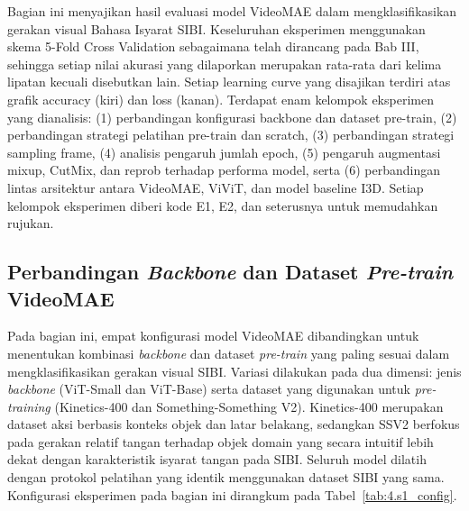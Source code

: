 Bagian ini menyajikan hasil evaluasi model VideoMAE dalam mengklasifikasikan gerakan visual Bahasa Isyarat SIBI. Keseluruhan eksperimen menggunakan skema 5-Fold Cross Validation sebagaimana telah dirancang pada Bab III, sehingga setiap nilai akurasi yang dilaporkan merupakan rata-rata dari kelima lipatan kecuali disebutkan lain. Setiap learning curve yang disajikan terdiri atas grafik accuracy (kiri) dan loss (kanan). Terdapat enam kelompok eksperimen yang dianalisis: (1) perbandingan konfigurasi backbone dan dataset pre-train, (2) perbandingan strategi pelatihan pre-train dan scratch, (3) perbandingan strategi sampling frame, (4) analisis pengaruh jumlah epoch, (5) pengaruh augmentasi mixup, CutMix, dan reprob terhadap performa model, serta (6) perbandingan lintas arsitektur antara VideoMAE, ViViT, dan model baseline I3D. Setiap kelompok eksperimen diberi kode E1, E2, dan seterusnya untuk memudahkan rujukan.
\subsection{Perbandingan \textit{Backbone} dan Dataset \textit{Pre-train} VideoMAE} \label{IV.Sek1}

Pada bagian ini, empat konfigurasi model VideoMAE dibandingkan untuk menentukan kombinasi \textit{backbone} dan dataset \textit{pre-train} yang paling sesuai dalam mengklasifikasikan gerakan visual SIBI. Variasi dilakukan pada dua dimensi: jenis \textit{backbone} (ViT-Small dan ViT-Base) serta dataset yang digunakan untuk \textit{pre-training} (Kinetics-400 dan Something-Something V2). Kinetics-400 merupakan dataset aksi berbasis konteks objek dan latar belakang, sedangkan SSV2 berfokus pada gerakan relatif tangan terhadap objek domain yang secara intuitif lebih dekat dengan karakteristik isyarat tangan pada SIBI. Seluruh model dilatih dengan protokol pelatihan yang identik menggunakan dataset SIBI yang sama. Konfigurasi eksperimen pada bagian ini dirangkum pada Tabel~\ref{tab:4.s1_config}.\par


